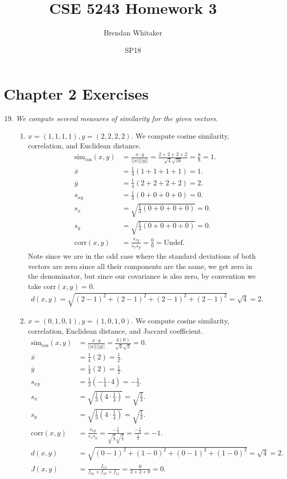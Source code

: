 \documentclass[12pt,oneside,reqno]{amsart}
\theoremstyle{plain}
\theoremstyle{definition}
\theoremstyle{remark}
\newcommand{\bee}{\begin{equation}\begin{aligned}}
\newcommand{\eee}{\end{aligned}\end{equation}}
\newcommand{\fracc}{\frac}
\renewcommand{\bar}{\overline}%
\begin{document}
\title{CSE 5243 Homework 3}
\date{SP18}
\author[Brendan Whitaker]{Brendan Whitaker}
\maketitle
\section*{Chapter 2 Exercises}
\begin{enumerate}[label=\arabic*.]
\setcounter{enumi}{18}

\item \textit{We compute several measures of similarity for the given vectors. }

\begin{enumerate}
\item $x = (1,1,1,1), y = (2,2,2,2)$. We compute cosine similarity, correlation, and Euclidean distance. 
\bee
\text{sim}_{\cos}(x,y) &= \fracc{x \cdot y}{||x||||y||} = \fracc{2 + 2 + 2 + 2}{\sqrt{4}\sqrt{16}} = \fracc{8}{8} = 1.\\
\bar{x} &= \fracc{1}{4}(1 + 1 + 1 + 1) = 1.\\
\bar{y} &= \fracc{1}{4}(2 + 2 + 2 + 2)= 2. \\
s_{xy} &= \fracc{1}{3}(0 + 0 + 0 + 0) = 0.\\
s_x &= \sqrt{\fracc{1}{3}(0 + 0 + 0 + 0)} = 0.\\
s_y &= \sqrt{\fracc{1}{3}(0 + 0 + 0 + 0)} = 0.\\
\text{corr}(x,y) &= \fracc{s_{xy}}{s_x s_y} = \fracc{0}{0} = \text{Undef.}
\eee
Note since we are in the odd case where the standard deviations of both vectors are zero since all their components are the same, we get zero in the denominator, but since our covariance is also zero, by convention we take corr$(x,y) = 0$. 
\bee
d(x,y) = \sqrt{(2 - 1)^2 +(2 - 1)^2 +(2 - 1)^2 +(2 - 1)^2} = \sqrt{4}= 2. 
\eee

\item $x = (0,1,0,1), y = (1,0,1,0)$. We compute cosine similarity, correlation, Euclidean distance, and Jaccard coefficient. 
\bee
\text{sim}_{\cos}(x,y) &= \fracc{x \cdot y}{||x||||y||} = \fracc{4(0)}{\sqrt{2}\sqrt{2}}  = 0.\\
\bar{x} &= \fracc{1}{4}(2) = \fracc{1}{2}.\\
\bar{y} &= \fracc{1}{4}(2)= \fracc{1}{2}. \\
s_{xy} &= \fracc{1}{3}(-\fracc{1}{4}\cdot 4) = -\fracc{1}{3}.\\
s_x &= \sqrt{\fracc{1}{3}(4 \cdot \fracc{1}{4})} =\sqrt{ \fracc{1}{3}}.\\
s_y &= \sqrt{\fracc{1}{3}(4 \cdot \fracc{1}{4})} = \sqrt{ \fracc{1}{3}}.\\
\text{corr}(x,y) &= \fracc{s_{xy}}{s_x s_y} = \fracc{-\fracc{1}{3}}{\sqrt{ \fracc{1}{3}}\sqrt{ \fracc{1}{3}}} = \fracc{-\fracc{1}{3}}{\fracc{1}{3}} = -1.\\
d(x,y) &= \sqrt{(0 - 1)^2 +(1 - 0)^2 +(0 - 1)^2 +(1 - 0)^2} = \sqrt{4}= 2. \\
J(x,y) &= \fracc{f_{11}}{f_{01}+ f_{10} + f_{11}} = \fracc{0}{2 + 2 + 0} = 0.
\eee


\end{enumerate}
\end{enumerate}
\end{document}
